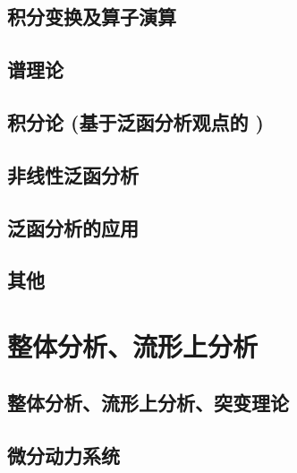\documentclass[UTF8]{../09-Mathematics}
\begin{document}
\section{积分变换及算子演算}
\section{谱理论}
\section{积分论 (基于泛函分析观点的 )}

\section{非线性泛函分析}
\section{泛函分析的应用}
\section{其他}




\chapter{整体分析、流形上分析}
\section{整体分析、流形上分析、突变理论}
\section{微分动力系统}
\end{document}
